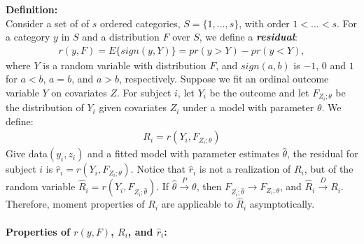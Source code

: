 \documentclass[]{article}
\begin{document}
\textbf{Definition:}\\
Consider a set of of $s$ ordered categories, $S=\{1,...,s\}$, with order $1<...<s$. For a category $y$ in $S$ and a distribution $F$ over $S$, we define a \textbf{\textit{residual}}:
$$
\begin{aligned}
	r(y,F)=E\{sign(y,Y)\} = pr(y>Y) - pr(y<Y),
\end{aligned}
$$
where $Y$ is a random variable with distribution $F$, and $sign(a,b)$ is $-1$, $0$ and $1$ for $a<b$, $a=b$, and $a>b$, respectively. Suppose we fit an ordinal outcome variable $Y$ on covariates $Z$. For subject $i$, let $Y_i$ be the outcome and let $F_{Z_i;\theta}$ be the distribution of $Y_i$ given covariates $Z_i$ under a model with parameter $\theta$. We define:
$$
\begin{aligned}
	R_i = r(Y_i,F_{Z_i;\theta})
\end{aligned}
$$
Give data$(y_i, z_i)$ and a fitted model with parameter estimates $\hat{\theta}$, the residual for subject $i$ is $\hat{r}_i = r(Y_i,F_{Z_i;\theta})$. Notice that $\hat{r}_i$ is not a realization of $R_i$, but of the random variable $\hat{R}_i = r(Y_i,F_{Z_i;\hat{\theta}})$. If $\hat{\theta} \overset{P}{\rightarrow} \theta$, then $F_{Z_i;\hat{\theta}} \rightarrow F_{Z_i;\theta}$, and $\hat{R}_i \overset{D}{\rightarrow} R_i$. Therefore, moment properties of $R_i$ are applicable to $\hat{R}_i$ asymptotically.\\
~\\
\textbf{Properties of $r(y, F)$, $R_i$, and $\hat{r}_i$:}
\end{document}
